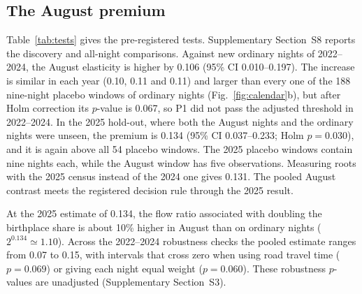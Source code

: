 \documentclass[pdflatex,sn-mathphys-num,referee]{sn-jnl}
\begin{document}
\subsection{The August premium}

Table~\ref{tab:tests} gives the pre-registered tests. Supplementary Section~S8 reports the discovery and all-night comparisons. Against new ordinary nights of 2022--2024, the August elasticity is higher by 0.106 (95\% CI 0.010--0.197). The increase is similar in each year (0.10, 0.11 and 0.11) and larger than every one of the 188 nine-night placebo windows of ordinary nights (Fig.~\ref{fig:calendar}b), but after Holm correction its $p$-value is 0.067, so P1 did not pass the adjusted threshold in 2022--2024. In the 2025 hold-out, where both the August nights and the ordinary nights were unseen, the premium is 0.134 (95\% CI 0.037--0.233; Holm $p=0.030$), and it is again above all 54 placebo windows. The 2025 placebo windows contain nine nights each, while the August window has five observations. Measuring roots with the 2025 census instead of the 2024 one gives 0.131. The pooled August contrast meets the registered decision rule through the 2025 result.

At the 2025 estimate of 0.134, the flow ratio associated with doubling the birthplace share is about 10\% higher in August than on ordinary nights ($2^{0.134}\simeq1.10$). Across the 2022--2024 robustness checks the pooled estimate ranges from 0.07 to 0.15, with intervals that cross zero when using road travel time ($p=0.069$) or giving each night equal weight ($p=0.060$). These robustness $p$-values are unadjusted (Supplementary Section~S3).
\end{document}
